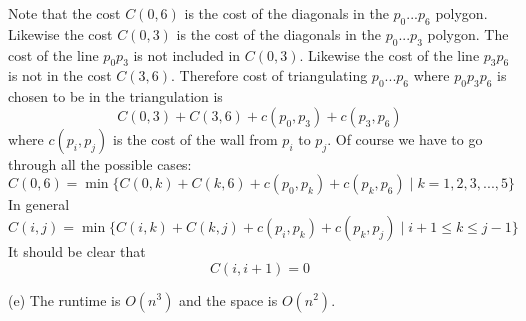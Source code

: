 Note that the cost $C(0,6)$ is the cost of the diagonals in the
$p_0...p_6$ polygon.
Likewise the cost $C(0,3)$ is the cost of the diagonals in
the $p_0 ... p_3$ polygon.
The cost of the line $p_0p_3$ is not included in $C(0,3)$.
Likewise the cost of the line $p_3 p_6$ is not in the cost $C(3,6)$.
Therefore cost of triangulating $p_0...p_6$ where $p_0p_3p_6$ is chosen to be in the
triangulation is
\[
  C(0,3) + C(3,6) + c(p_0,p_3) + c(p_3,p_6)
\]
where $c(p_i, p_j)$ is the cost of the wall from $p_i$ to $p_j$.
Of course we have to go through all the possible cases:
\[
  C(0, 6)
  =
  \min
  \{
  C(0,k) + C(k, 6) + c(p_0, p_k) + c(p_k, p_6)
  \mid
  k = 1, 2, 3, ..., 5
  \}
\]
In general
\[
  C(i,j)
  =
  \min
  \{
  C(i,k) + C(k, j) + c(p_i, p_k) + c(p_k, p_j)
  \mid
  i + 1 \leq k \leq j - 1
  \}
\]
It should be clear that
\[
  C(i, i + 1) = 0
\]

(e) The runtime is $O(n^3)$ and the space is $O(n^2)$.
